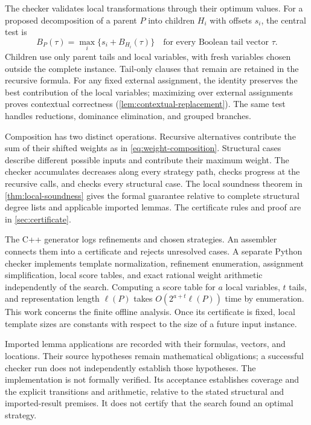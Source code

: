 \documentclass[11pt]{article}
\theoremstyle{definition}
\theoremstyle{remark}
\begin{document}
The checker validates local transformations through their optimum values.
For a proposed decomposition of a parent $P$ into children $H_i$ with offsets
$s_i$, the central test is
\begin{equation}
 B_P(\tau)=\max_i\{s_i+B_{H_i}(\tau)\}
 \quad\text{for every Boolean tail vector }\tau.
 \label{eq:semantic-decomposition}
\end{equation}
Children use only parent tails and local variables, with fresh variables
chosen outside the complete instance. Tail-only clauses that remain are
retained in the recursive formula. For any fixed external assignment, the
identity preserves the best contribution of the local variables; maximizing
over external assignments proves contextual correctness
(\cref{lem:contextual-replacement}). The same test handles reductions,
dominance elimination, and grouped branches.

Composition has two distinct operations. Recursive alternatives contribute
the sum of their shifted weights as in \cref{eq:weight-composition}.
Structural cases describe different possible inputs and contribute their
maximum weight. The checker accumulates decreases along every strategy path,
checks progress at the recursive calls, and checks every structural case.
The local soundness theorem in \cref{thm:local-soundness} gives the formal
guarantee relative to complete structural degree lists and applicable
imported lemmas. The certificate rules and proof are in
\cref{sec:certificate}.

The C++ generator logs refinements and chosen strategies. An assembler connects
them into a certificate and rejects unresolved cases. A separate Python checker
implements template normalization, refinement enumeration, assignment
simplification, local score tables, and exact rational weight arithmetic
independently of the search. Computing a score table for $a$ local variables,
$t$ tails, and representation length $\ell(P)$ takes
$O(2^{a+t}\ell(P))$ time by enumeration. This work concerns the finite offline
analysis. Once its certificate is fixed, local template sizes are constants
with respect to the size of a future input instance.

Imported lemma applications are recorded with their formulas, vectors, and
locations. Their source hypotheses remain mathematical obligations; a
successful checker run does not independently establish those hypotheses.
The implementation is not formally verified. Its acceptance establishes
coverage and the explicit transitions and arithmetic, relative to the stated
structural and imported-result premises. It does not certify that the search
found an optimal strategy.
\end{document}
